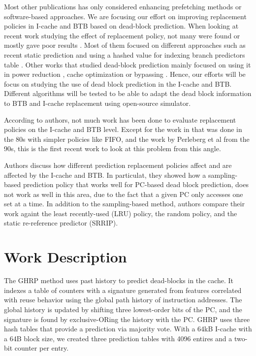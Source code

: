 \documentclass[11pt]{article}
\begin{document}
Most other publications has only considered enhancing prefetching methods or software-based approaches. We are focusing our 
effort on improving replacement policies in I-cache and BTB based on dead-block prediction. When looking at recent work studying 
the effect of replacement policy, not many were found or mostly gave poor results \cite{ship-micro-2011, ISCA-2006} . Most of them focused on different approaches 
such as recent static prediction \cite{rrip-2010} and using a hashed value for indexing branch predictors table \cite{acm-2005}. Other works that studied dead-block 
prediction mainly focused on using it in power reduction \cite{IATAC-2005}, cache optimization \cite{ieeeCAT-2000} or bypassing \cite{johnson-1999}. Hence, our efforts will be focus on studying the use of dead block prediction
in the I-cache and BTB. Different algorithms will be tested to be able to adapt the dead block information to BTB and I-cache replacement using open-source simulator.  

According to authors, not much work has been done to evaluate replacement policies on the I-cache and BTB level. Except for the work in \cite{smith-1985} that was done in the 80s
with simpler policies like FIFO, and the work by Perleberg et al \cite{perleberg-1993} from the 90s, this is the first recent work to look at this problem from this angle.

Authors discuss how different prediction replacement policies affect and are affected by the I-cache and BTB. In particulat, they showed how a sampling-based
prediction policy that works well for PC-based dead block prediction, does not work as well in this area, due to the fact that a given PC only accesses one set at a time.
In addition to the sampling-based method, authors compare their work againt the least recently-used (LRU) policy, the random policy, and the static re-reference predictor (SRRIP).


\section{Work Description}
\label{sec:Work Description}
The GHRP method uses past history to predict dead-blocks in the cache.
It indexes a table of counters with a signature generated from features correlated with reuse behavior using the global path history
of instruction addresses.
The global history is updated by shifting three lowest-order bits of the PC, and the signature is found by exclusive-ORing the history with the PC.
GHRP uses three hash tables that provide a prediction via majority vote.
With a 64kB I-cache with a 64B block size, we created three prediction tables with 4096 entires and a two-bit counter per entry.
\par
\end{document}
